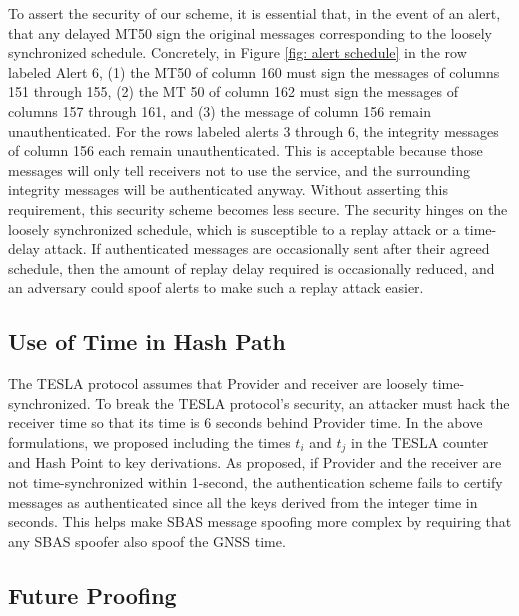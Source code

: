 \documentclass[letterpaper,times]{IONconf/IONconf}
\begin{document}
To assert the security of our scheme, it is essential that, in the event of an alert, that any delayed MT50 sign the original messages corresponding to the loosely synchronized schedule.
Concretely, in Figure \ref{fig: alert schedule} in the row labeled Alert 6, (1) the MT50 of column 160 must sign the messages of columns 151 through 155, (2) the MT 50 of column 162 must sign the messages of columns 157 through 161, and (3) the message of column 156 remain unauthenticated.
For the rows labeled alerts 3 through 6, the integrity messages of column 156 each remain unauthenticated.
This is acceptable because those messages will only tell receivers not to use the service, and the surrounding integrity messages will be authenticated anyway.
Without asserting this requirement, this security scheme becomes less secure.
The security hinges on the loosely synchronized schedule, which is susceptible to a replay attack or a time-delay attack.
If authenticated messages are occasionally sent after their agreed schedule, then the amount of replay delay required is occasionally reduced, and an adversary could spoof alerts to make such a replay attack easier.

\subsection{Use of Time in Hash Path} \label{sec: time and keys}

The TESLA protocol assumes that Provider and receiver are loosely time-synchronized.
To break the TESLA protocol's security, an attacker must hack the receiver time so that its time is 6 seconds behind Provider time.
In the above formulations, we proposed including the times $t_i$ and $t_j$ in the TESLA counter and Hash Point to key derivations.
As proposed, if Provider and the receiver are not time-synchronized within 1-second, the authentication scheme fails to certify messages as authenticated since all the keys derived from the integer time in seconds.
This helps make SBAS message spoofing more complex by requiring that any SBAS spoofer also spoof the GNSS time.

\subsection{Future Proofing}
\end{document}
